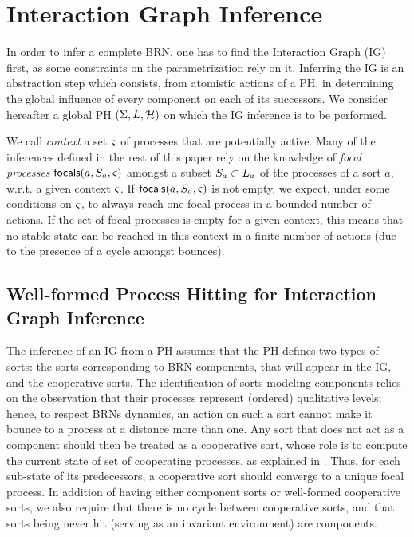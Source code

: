 \section{Interaction Graph Inference}\label{sec:infer-IG}

In order to infer a complete BRN, one has to find the Interaction Graph (IG) first, as some constraints on the parametrization rely on it.
Inferring the IG is an abstraction step which consists, from atomistic actions of a PH, in determining the global influence of every component on each of its successors.
We consider hereafter a global PH $(\Sigma,L,\mathcal{H})$ on which the IG inference is to be performed.

We call \emph{context} a set $\varsigma$ of processes that are potentially active.
Many of the inferences defined in the rest of this paper rely on the knowledge of \emph{focal processes} $\mathsf{focals}(a,S_a,\varsigma)$ %
amongst a subset $S_a \subset L_a$ of the processes of a sort $a$, w.r.t. a given context $\varsigma$. %
If $\mathsf{focals}(a,S_a,\varsigma)$ is not empty, we expect, under some conditions on $\varsigma$, to always reach one focal process in a bounded number of actions.
If the set of focal processes is empty for a given context, this means that no stable state can be reached in this context in a finite number of actions (due to the presence of a cycle amongst bounces).



\subsection{Well-formed Process Hitting for Interaction Graph Inference}\label{ssec:wf}

The inference of an IG from a PH assumes that the PH defines two types of sorts: the sorts corresponding to BRN components, that will appear in the IG, and the cooperative sorts.
The identification of sorts modeling components relies on the observation that their processes represent (ordered) qualitative levels;
hence, to respect BRNs dynamics, an action on such a sort cannot make it bounce to a process at a distance more than one.
Any sort that does not act as a component should then be treated as a cooperative sort, whose role is to compute the current state of set of cooperating processes, as explained in .
Thus, for each sub-state of its predecessors, a cooperative sort should converge to a unique focal process.
In addition of having either component sorts or well-formed cooperative sorts, we also require that there is no cycle between cooperative sorts, and that sorts being never hit (\ie serving as an invariant environment) are components.

